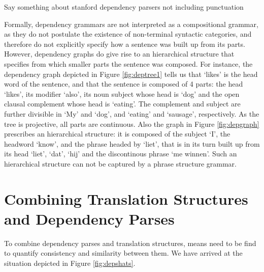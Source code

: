 \documentclass{report}
\theoremstyle{definition}
\theoremstyle{plain}
\begin{document}
Say something about stanford dependency parsers not including punctuation


Formally, dependency grammars are not interpreted as a compositional grammar, as they do not postulate the existence of non-terminal syntactic categories, and therefore do not explicitly specify how a sentence was built up from its parts. However, dependency graphs do give rise to an hierarchical structure that specifies from which smaller parts the sentence was composed. For instance, the dependency graph depicted in Figure \ref{fig:deptree1} tells us that `likes' is the head word of the sentence, and that the sentence is composed of 4 parts: the head `likes', its modifier `also', its noun subject whose head is `dog' and the open clausal complement whose head is `eating'. The complement and subject are further divisible in `My' and `dog', and `eating' and `sausage', respectively. As the tree is projective, all parts are continuous. Also the graph in Figure \ref{fig:depgraph} prescribes an hierarchical structure: it is composed of the subject `I', the headword `know', and the phrase headed by `liet', that is in its turn built up from its head `liet', `dat', `hij' and the discontinous phrase `me winnen'. Such an hierarchical structure can not be captured by a phrase structure grammar.

\section{Combining Translation Structures and Dependency Parses}

To combine dependency parses and translation structures, means need to be find to quantify consistency and similarity between them. We have arrived at the situation depicted in Figure \ref{fig:depshats}.
\end{document}
